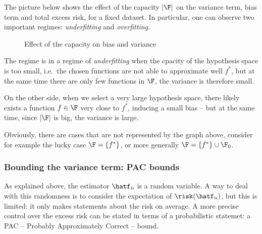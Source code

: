 \documentclass[toc, titlepaged]{../cs-classes/cs-classes}
\begin{document}
The picture below shows the effect of the capacity $|\F|$ on the variance term, bias term and total excess risk, for a fixed dataset. In particular, one can observe two important regimes: \emph{underfitting} and \emph{overfitting}.

\begin{figure}[H]
    \centering
    \caption{Effect of the capacity on bias and variance}
\end{figure}

The regime is in a regime of \emph{underfitting} when the cpacity of the hypothesis space is too small, i.e.~the chosen functions are not able to approximate well $f^*$, but at the same time there are only few functions in $\F$, the variance is therefore small.

On the other side, when we select a very large hypothesis space, there likely exists a function $f\in\F$ very close to $f^*$, inducing a small bias -- but at the same time, since $|\F|$ is big, the variance is large. 

Obviously, there are cases that are not represented by the graph above, consider for example the lucky case $\F=\{f^*\}$, or more generally $\F=\{f^*\}\cup\F_0$.

\subsubsection{Bounding the variance term: PAC bounds}
As explained above, the estimator $\hatf_n$ is a random variable. A way to deal with this randomness is to consider the expectation of $\risk(\hatf_n)$, but this is limited: it only makes statements about the risk on average. A more precise control over the excess risk can be stated in terms of a probabilistic statemet: a PAC -- Probably Approximately Correct -- bound.
\end{document}
